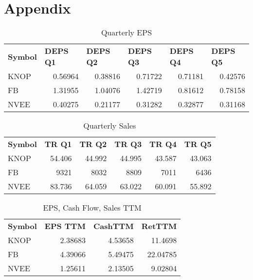 \documentclass{article}
\begin{document}
\section{Appendix}
\begin{table}[htbp]
  \caption{Quarterly EPS}
   \begin{tabular}{lrrrrr}
    \textbf{Symbol} & \multicolumn{1}{l}{\textbf{DEPS Q1}} & \multicolumn{1}{l}{\textbf{DEPS Q2}} & \multicolumn{1}{l}{\textbf{DEPS Q3}} & \multicolumn{1}{l}{\textbf{DEPS Q4}} & \multicolumn{1}{l}{\textbf{DEPS Q5}} \\
    KNOP  & 0.56964 & 0.38816 & 0.71722 & 0.71181 & 0.42576 \\
    FB    & 1.31955 & 1.04076 & 1.42719 & 0.81612 & 0.78158 \\
    NVEE  & 0.40275 & 0.21177 & 0.31282 & 0.32877 & 0.31168 \\
    \end{tabular}%
  \label{tab:addlabel}%
\end{table}%

\begin{table}[htbp]
  \caption{Quarterly Sales}
    \begin{tabular}{lrrrrr}
    \textbf{Symbol} & \multicolumn{1}{l}{\textbf{TR Q1}} & \multicolumn{1}{l}{\textbf{TR Q2}} & \multicolumn{1}{l}{\textbf{TR Q3}} & \multicolumn{1}{l}{\textbf{TR Q4}} & \multicolumn{1}{l}{\textbf{TR Q5}} \\
    KNOP  & 54.406 & 44.992 & 44.995 & 43.587 & 43.063 \\
    FB    & 9321  & 8032  & 8809  & 7011  & 6436 \\
    NVEE  & 83.736 & 64.059 & 63.022 & 60.091 & 55.892 \\
    \end{tabular}%
  \label{tab:addlabel}%
\end{table}%

\begin{table}[htbp]
  \caption{EPS, Cash Flow, Sales TTM}
   \begin{tabular}{lrrr}
    \textbf{Symbol} & \multicolumn{1}{l}{\textbf{EPS TTM}} & \multicolumn{1}{l}{\textbf{CashTTM}} & \multicolumn{1}{l}{\textbf{RetTTM}} \\
    KNOP  & 2.38683 & 4.53658 & 11.4698 \\
    FB    & 4.39066 & 5.49475 & 22.04785 \\
    NVEE  & 1.25611 & 2.13505 & 9.02804 \\
    \end{tabular}%
  \label{tab:addlabel}%
\end{table}%
\end{document}
